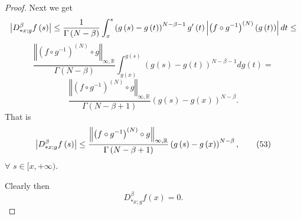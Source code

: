 \documentclass[10pt]{NSP1}
\numberwithin{equation}{section}
\begin{document}
\begin{proof}
Next we get
\begin{equation*}
\left \vert D_{\ast x;g}^{\beta }f\left( s\right) \right \vert \leq \frac{1}{%
\Gamma \left( N-\beta \right) }\int_{x}^{s}\left( g\left( s\right) -g\left(
t\right) \right) ^{N-\beta -1}g^{\prime }\left( t\right) \left \vert \left(
f\circ g^{-1}\right) ^{\left( N\right) }\left( g\left( t\right) \right)
\right \vert dt\leq
\end{equation*}
\begin{equation}
\frac{\left \Vert \left( f\circ g^{-1}\right) ^{\left( N\right) }\circ
g\right \Vert _{\infty ,\mathbb{R}}}{\Gamma \left( N-\beta \right) }%
\int_{g\left( x\right) }^{g\left( s\right) }\left( g\left( s\right) -g\left(
t\right) \right) ^{N-\beta -1}dg\left( t\right) =  \tag{52}  \label{52}
\end{equation}
\begin{equation*}
\frac{\left \Vert \left( f\circ g^{-1}\right) ^{\left( N\right) }\circ
g\right \Vert _{\infty ,\mathbb{R}}}{\Gamma \left( N-\beta +1\right) }\left(
g\left( s\right) -g\left( x\right) \right) ^{N-\beta }.
\end{equation*}
That is
\begin{equation}
\left \vert D_{\ast x;g}^{\beta }f\left( s\right) \right \vert \leq \frac{%
\left \Vert \left( f\circ g^{-1}\right) ^{\left( N\right) }\circ g\right
\Vert _{\infty ,\mathbb{R}}}{\Gamma \left( N-\beta +1\right) }\left( g\left(
s\right) -g\left( x\right) \right) ^{N-\beta },  \tag{53}  \label{53}
\end{equation}
$\forall $ $s\in \lbrack x,+\infty ).$

Clearly then
\begin{equation}
D_{\ast x;g}^{\beta }f\left( x\right) =0.  \tag{54}  \label{54}
\end{equation}


\end{proof}
\end{document}

